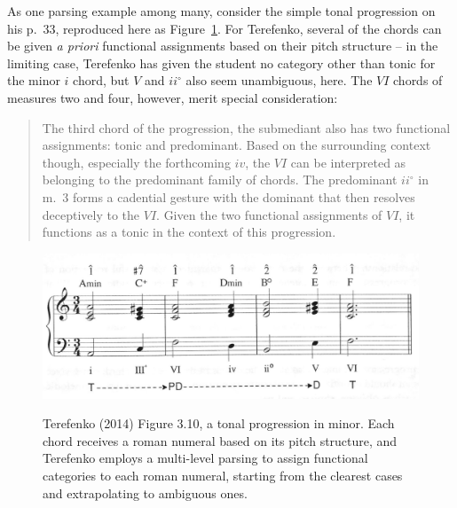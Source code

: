 As one parsing example among many, consider the simple tonal progression on his p.\ 33, reproduced here as Figure~\ref{Terefenko_ex}.  For Terefenko, several of the chords can be given \emph{a priori} functional assignments based on their pitch structure -- in the limiting case, Terefenko has given the student no category other than tonic for the minor $i$ chord, but $V$ and $ii^\circ$ also seem unambiguous, here.  The $VI$ chords of measures two and four, however, merit special consideration:
\begin{quote}
The third chord of the progression, the submediant also has two functional assignments: tonic and predominant.  Based on the surrounding context though, especially the forthcoming $iv$, the $VI$ can be interpreted as belonging to the predominant family of chords.  The predominant $ii^{\circ}$ in m.\ 3 forms a cadential gesture with the dominant that then resolves deceptively to the $VI$.  Given the two functional assignments of $VI$, it functions as a tonic in the context of this progression.
\end{quote}

\begin{figure}
	\centering
	\caption{Terefenko (2014) Figure 3.10, a tonal progression in minor.  Each chord receives a roman numeral based on its pitch structure, and Terefenko employs a multi-level parsing to assign functional categories to each roman numeral, starting from the clearest cases and extrapolating to ambiguous ones.}
	\includegraphics[width=5in]{Terefenko_ex.png}
	\label{Terefenko_ex}
\end{figure}

